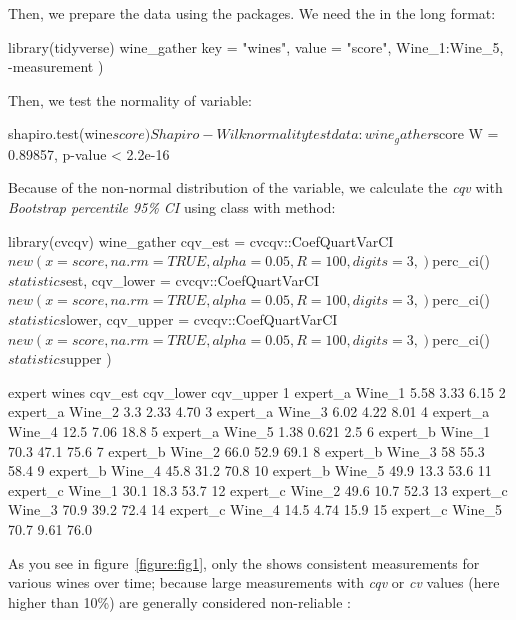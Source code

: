 Then, we prepare the data using the  \citep{Wickham_2017} packages. We need the   in the long format:
\begin{example}
library(tidyverse)
wine_gather %
  key = "wines",
  value = "score",
  Wine_1:Wine_5, -measurement
)
\end{example}
Then, we test the normality of  variable:
\begin{example}
shapiro.test(wine$score)
	Shapiro-Wilk normality test

data:  wine_gather$score
W = 0.89857, p-value < 2.2e-16
\end{example}

Because of the non-normal distribution of the  variable, we calculate the \emph{cqv} with \emph{Bootstrap percentile 95\% CI} using   class  with  method:

\begin{example}
library(cvcqv)
wine_gather %
  cqv_est = cvcqv::CoefQuartVarCI$new(
    x = score, na.rm = TRUE, alpha = 0.05, R = 100, digits = 3,
  )$perc_ci()$statistics$est,
  cqv_lower = cvcqv::CoefQuartVarCI$new(
    x = score, na.rm = TRUE, alpha = 0.05, R = 100, digits = 3,
  )$perc_ci()$statistics$lower,
  cqv_upper = cvcqv::CoefQuartVarCI$new(
    x = score, na.rm = TRUE, alpha = 0.05, R = 100, digits = 3,
  )$perc_ci()$statistics$upper
)

   expert   wines  cqv_est cqv_lower cqv_upper
 1 expert_a Wine_1    5.58     3.33       6.15
 2 expert_a Wine_2    3.3      2.33       4.70
 3 expert_a Wine_3    6.02     4.22       8.01
 4 expert_a Wine_4   12.5      7.06      18.8 
 5 expert_a Wine_5    1.38     0.621      2.5 
 6 expert_b Wine_1   70.3     47.1       75.6 
 7 expert_b Wine_2   66.0     52.9       69.1 
 8 expert_b Wine_3   58       55.3       58.4 
 9 expert_b Wine_4   45.8     31.2       70.8 
10 expert_b Wine_5   49.9     13.3       53.6 
11 expert_c Wine_1   30.1     18.3       53.7 
12 expert_c Wine_2   49.6     10.7       52.3 
13 expert_c Wine_3   70.9     39.2       72.4 
14 expert_c Wine_4   14.5      4.74      15.9 
15 expert_c Wine_5   70.7      9.61      76.0 
\end{example}

As you see in figure~\ref{figure:fig1}, only the  shows consistent measurements for various wines over time; because large measurements with \emph{cqv} or \emph{cv} values (here higher than 10\%) are generally considered non-reliable \citep{Beigy_b_2019}:

